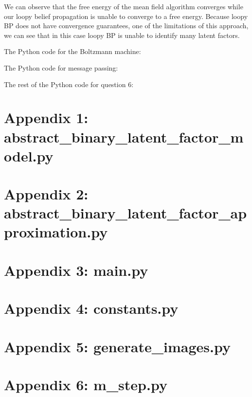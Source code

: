 \documentclass[12pt]{article}
\begin{document}
We can observe that the free energy of the mean field algorithm converges while our loopy belief propagation is unable to converge to a free energy. Because loopy BP does not have convergence guarantees, one of the limitations of this approach, we can see that in this case loopy BP is unable to identify many latent factors.

\newpage
The Python code for the Boltzmann machine:


\newpage
The Python code for message passing:


\newpage
The rest of the Python code for question 6:


\newpage
\section*{Appendix 1: abstract\_binary\_latent\_factor\_model.py}

\newpage
\section*{Appendix 2: abstract\_binary\_latent\_factor\_approximation.py}

\newpage
\section*{Appendix 3: main.py}

\newpage
\section*{Appendix 4: constants.py}

\section*{Appendix 5: generate\_images.py}

\newpage
\section*{Appendix 6: m\_step.py}

\end{document}

